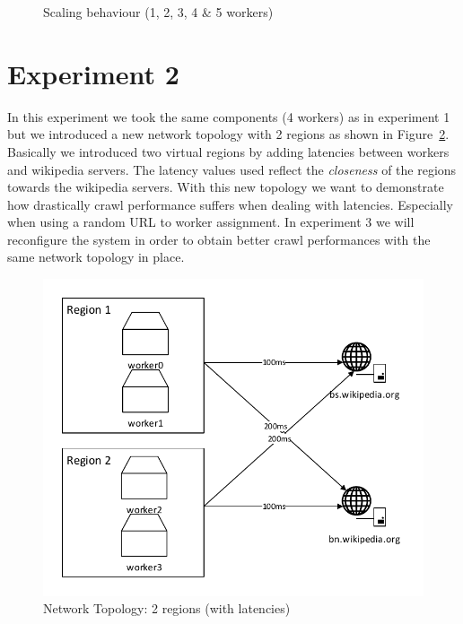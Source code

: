 \newline
\newline
\begin{figure}
\centering
\caption{Scaling behaviour (1, 2, 3, 4 \& 5 workers)}
\label{plot:exp_001}
\end{figure}

\section{Experiment 2}

In this experiment we took the same components (4 workers) as in experiment 1 but we introduced a new network topology with 2 regions as shown in Figure~\ref{test_setup2}. Basically we introduced two virtual regions by adding latencies between workers and wikipedia servers. The latency values used reflect the \emph{closeness} of the regions towards the wikipedia servers. With this new topology we want to demonstrate how drastically crawl performance suffers when dealing with latencies. Especially when using a random URL to worker assignment. In experiment 3 we will reconfigure the system in order to obtain better crawl performances with the same network topology in place.

\begin{figure}[h]
\centering
  \includegraphics[width=1.0\textwidth]{Figures/test_setup2.pdf}
  \caption{Network Topology: 2 regions (with latencies)}
\label{test_setup2}
\end{figure}


